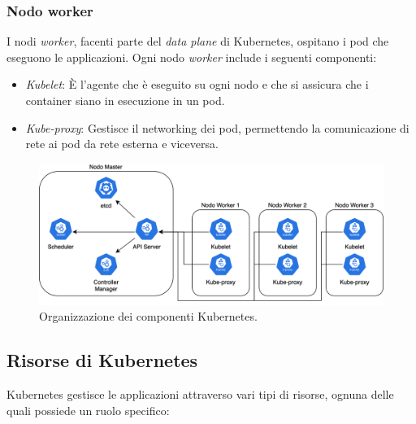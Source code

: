 \subsubsection{Nodo worker}
I nodi \textit{worker}, facenti parte del \textit{data plane} di Kubernetes, ospitano i pod che eseguono le applicazioni. Ogni nodo \textit{worker} include i seguenti componenti:

\begin{itemize}
\item \textit{Kubelet}: È l'agente che è eseguito su ogni nodo e che si assicura che i container siano in esecuzione in un pod.
\item \textit{Kube-proxy}: Gestisce il networking dei pod, permettendo la comunicazione di rete ai pod da rete esterna e viceversa.
\end{itemize}

\begin{figure}[h]
    \centering
    \includegraphics[width=1\linewidth]{immagini/capitolo2/kubernetes_planes.png}
    \caption{Organizzazione dei componenti Kubernetes.}
    \label{fig:kube_components}
\end{figure}

\subsection{Risorse di Kubernetes}

Kubernetes gestisce le applicazioni attraverso vari tipi di risorse, ognuna delle quali possiede un ruolo specifico:

